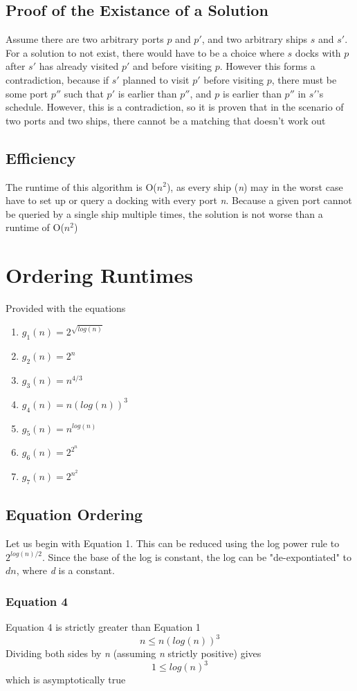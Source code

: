 \documentclass[titlepage]{article}
\numberwithin{equation}{subsection}
\begin{document}
\subsection{Proof of the Existance of a Solution}
Assume there are two arbitrary ports $p$ and $p'$, and two arbitrary ships $s$ and $s'$.
For a solution to not exist, there would have to be a choice where $s$ docks with $p$ after $s'$ has already
visited $p'$ and before visiting $p$. However this forms a contradiction,
because if $s'$ planned to visit $p'$ before visiting $p$, there must be some port $p''$ such that
$p'$ is earlier than $p''$, and $p$ is earlier than $p''$ in $s'$'s schedule. However, this is a contradiction, so
it is proven that in the scenario of two ports and two ships, there cannot be a matching that doesn't
work out
\subsection{Efficiency}
The runtime of this algorithm is O($n^2$), as every ship (\textit{n}) may in the worst case have to
set up or query a docking with every port \textit{n}. Because a given port cannot be queried by
a single ship multiple times, the solution is not worse than a runtime of O($n^2$)
\section{Ordering Runtimes}
Provided with the equations
\begin{enumerate}
    \item $g_1(n) = 2^{\sqrt{log(n)}}$
    \item $g_2(n) = 2^n$
    \item $g_3(n) = n^{4/3}$
    \item $g_4(n) = n(log(n))^3$
    \item $g_5(n) = n^{log(n)}$
    \item $g_6(n) = 2^{2^n}$
    \item $g_7(n) = 2^{n^2}$
\end{enumerate}

\subsection{Equation Ordering}
Let us begin with Equation 1. This can be reduced using the log power rule to
$2^{log(n)/2}$. Since the base of the log is constant, the log can be "de-expontiated" to
$dn$, where \textit{d} is a constant.
\subsubsection{Equation 4}
    Equation 4 is strictly greater than Equation 1
    \begin{equation}
        n \leq n(log(n))^3
    \end{equation}
    Dividing both sides by \textit{n} (assuming \textit{n} strictly positive) gives
    \begin{equation}
        1 \leq log(n)^3
    \end{equation}
    which is asymptotically true
\end{document}
